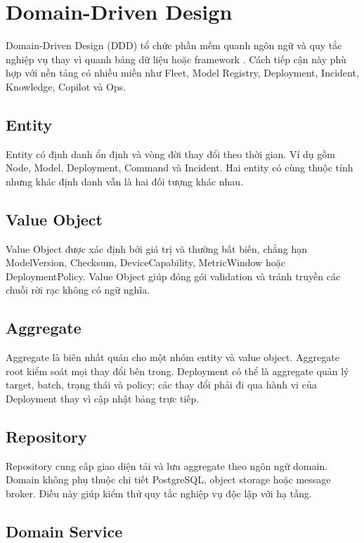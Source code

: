 \section{Domain-Driven Design}

Domain-Driven Design (DDD) tổ chức phần mềm quanh ngôn ngữ và quy tắc nghiệp
vụ thay vì quanh bảng dữ liệu hoặc framework \cite{evans2003ddd}. Cách tiếp cận
này phù hợp với nền tảng có nhiều miền như Fleet, Model Registry, Deployment,
Incident, Knowledge, Copilot và Ops.

\subsection{Entity}

Entity có định danh ổn định và vòng đời thay đổi theo thời gian. Ví dụ gồm Node,
Model, Deployment, Command và Incident. Hai entity có cùng thuộc tính nhưng
khác định danh vẫn là hai đối tượng khác nhau.

\subsection{Value Object}

Value Object được xác định bởi giá trị và thường bất biến, chẳng hạn ModelVersion,
Checksum, DeviceCapability, MetricWindow hoặc DeploymentPolicy. Value Object
giúp đóng gói validation và tránh truyền các chuỗi rời rạc không có ngữ nghĩa.

\subsection{Aggregate}

Aggregate là biên nhất quán cho một nhóm entity và value object. Aggregate root
kiểm soát mọi thay đổi bên trong. Deployment có thể là aggregate quản lý target,
batch, trạng thái và policy; các thay đổi phải đi qua hành vi của Deployment thay
vì cập nhật bảng trực tiếp.

\subsection{Repository}

Repository cung cấp giao diện tải và lưu aggregate theo ngôn ngữ domain. Domain
không phụ thuộc chi tiết PostgreSQL, object storage hoặc message broker. Điều này
giúp kiểm thử quy tắc nghiệp vụ độc lập với hạ tầng.

\subsection{Domain Service}

